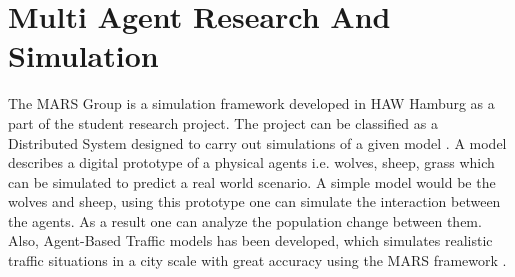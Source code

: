
\section{Multi Agent Research And Simulation}
        \label{section:MARS}
        The MARS Group is a simulation framework developed 
        in HAW Hamburg as a  part of the student research project. The project can be classified as a
        Distributed System \cite{DistributedSystems} designed to carry out simulations of a given model 
        \cite{HAWHamburgMARS}. 
        A model describes a digital prototype of a physical agents i.e. wolves, sheep, grass 
        which can be simulated to predict a real world scenario. A simple model would
        be the wolves and sheep, using this prototype one can simulate the interaction between the agents. 
        As a result one can analyze the population change between them. Also, Agent-Based Traffic
        models has been developed, which simulates realistic traffic situations in a city scale with great accuracy 
        using the MARS framework \cite{TrafficModel}.

        \par
